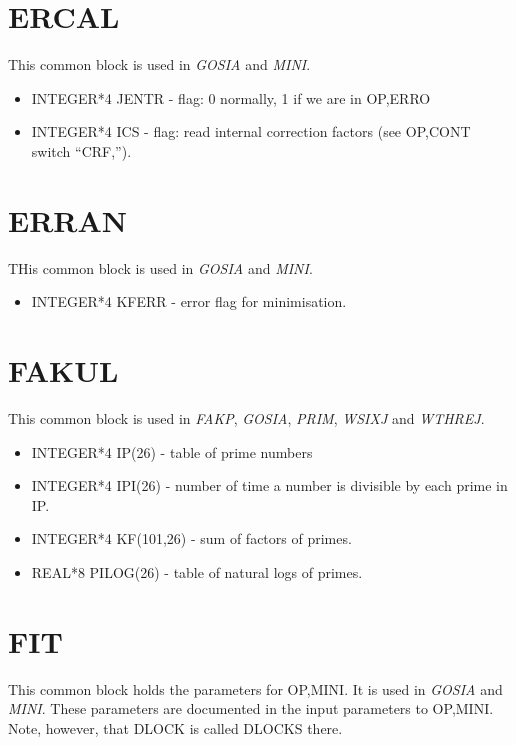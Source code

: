 \section{ERCAL}

This common block is used in \emph{GOSIA} and \emph{MINI}.

\begin{itemize}
\item INTEGER*4 JENTR - flag: 0 normally, 1 if we are in OP,ERRO
\item INTEGER*4 ICS - flag: read internal correction factors (see OP,CONT
switch ``CRF,'').
\end{itemize}

\section{ERRAN}

THis common block is used in \emph{GOSIA} and \emph{MINI}.

\begin{itemize}
\item INTEGER*4 KFERR - error flag for minimisation.
\end{itemize}

\section{FAKUL}

This common block is used in \emph{FAKP}, \emph{GOSIA}, \emph{PRIM}, \emph{
WSIXJ} and \emph{WTHREJ}.

\begin{itemize}
\item INTEGER*4 IP(26) - table of prime numbers
\item INTEGER*4 IPI(26) - number of time a number is divisible by each prime
in IP.
\item INTEGER*4 KF(101,26) - sum of factors of primes.
\item REAL*8 PILOG(26) - table of natural logs of primes.
\end{itemize}

\section{FIT}

This common block holds the parameters for OP,MINI. It is used in \emph{
GOSIA} and \emph{MINI}. These parameters are documented in the input
parameters to OP,MINI. Note, however, that DLOCK is called DLOCKS there.

